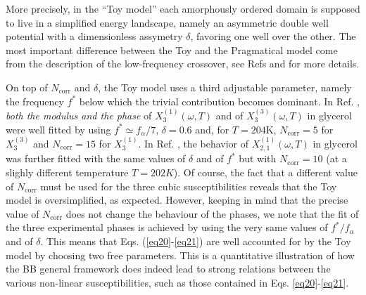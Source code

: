 \documentclass[single column,pre]{revtex4}
\begin{document}
More precisely, in the ``Toy model'' each amorphously ordered domain is supposed to live in a simplified energy landscape, namely an asymmetric double well potential with a dimensionless 
assymetry $\delta$, favoring one well over the other. The most important difference between the Toy and the Pragmatical model come from the description of the low-frequency crossover, see Refs \cite{Lad12} and \cite{Buc16b} for more details.  

On top of $N_{\text{corr}}$ and $\delta$, the Toy model uses a third adjustable parameter, namely the frequency $f^*$ below which the trivial contribution becomes dominant. In Ref. \cite{Lad12}, \textit{both the modulus and the phase} of $X_3^{(1)}(\omega, T)$ and of $X_3^{(3)}(\omega, T)$ in glycerol were well fitted by using $f^* \simeq f_\alpha/7$, $\delta = 0.6$ and, for $T=204$K, $N_{\text{corr}} = 5$ for $X_3^{(3)}$ and $N_{\text{corr}} = 15$ for $X_3^{(1)}$. In Ref. \cite{Lho14}, the behavior of $X_{2,1}^{(1)}(\omega, T)$ in glycerol was further fitted with the same values of $\delta$ and of $f^*$ but with $N_{\text{corr}} = 10$ (at a slighly different temperature $T=202K$). Of course, 
the fact that a different value of $N_{\text{corr}}$ must be used for the three cubic susceptibilities reveals that the Toy model is oversimplified, as expected. 
However, keeping in mind that the precise value of $N_{\text{corr}}$ does not change the behaviour of the phases, we note that the 
fit of the three experimental phases is achieved \cite{Lad12,Lho14} by using the very same values of $f^*/f_{\alpha}$ and of $\delta$. This means 
that Eqs. (\ref{eq20}-\ref{eq21}) are well accounted for by the Toy model by choosing two free parameters.  
This is a quantitative illustration of how the BB general framework does indeed lead to strong relations between the various non-linear susceptibilities, such as those contained in Eqs. \ref{eq20}-\ref{eq21}.
\end{document}
